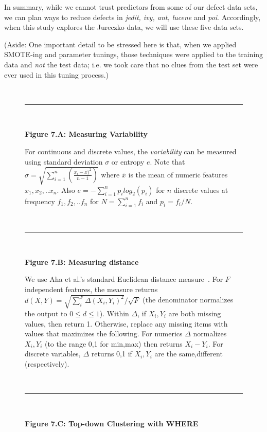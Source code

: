 \documentclass{sig-alternate}
\begin{document}
In summary, while we cannot trust predictors from some of our defect data sets,
we can plan ways to reduce defects in {\em jedit, ivy, ant, lucene} and {\em poi}.
Accordingly, when this study explores the Jureczko data, we will use these five data sets.

(Aside: One important detail to be stressed here is that, when we applied    SMOTE-ing and
parameter tunings, those techniques were applied to the training data and {\em not}
the test data; i.e. we took care that no clues from the test set were ever used in this tuning process.)



	\begin{figure} 
	\begin{shaded}
  ~\hrule~
  
 {\bf Figure 7.A: Measuring Variability} 
	
	For  continuous and discrete values,
the {\em variability} can be measured using standard deviation $\sigma$ or entropy $e$.
Note that \mbox{$\sigma = \sqrt{\sum^n_{i=1} \left( \frac{x_i - \bar{x})^2}{n-1}\right)}$}
where $\bar{x}$ is the mean of  numeric features $x_1,x_2,..x_n$.
Also \mbox{$e = - \sum^n_{i=1} p_i \mathit{log}_2(p_i)$} 
for  $n$ discrete values  at frequency
$f_1,f_2,.. f_n$ for \mbox{$N = \sum^n_{i=1} f_i$} and $p_i = f_i/N$.

  ~\hrule~
	
	{\bf Figure 7.B: Measuring distance}
	
	We use
		 Aha et al.'s standard Euclidean distance measure~\cite{aha91}.  For $F$ independent features, the measure returns   $d(X,Y)=\sqrt{\sum_i^F  \Delta(X_i,Y_i)^2}/\sqrt{F}$
			(the denominator normalizes the output to $0 \le d \le 1$).
			Within $\Delta$, if   $X_i,Y_i$ are both missing  values, then  return 1.
			Otherwise, replace any  missing items with values that maximizes the following.
			For numerics $\Delta$ normalizes $X_i,Y_i$ (to the range 0,1 for min,max) then
			returns 
			$X_i - Y_i$. For discrete variables, $\Delta$ returns 0,1 if $X_i,Y_i$ are the
			same,different (respectively).  

 ~\hrule~
 
	{\bf Figure 7.C: Top-down Clustering with WHERE}
	

\end{shaded}
\end{figure}
\end{document}
